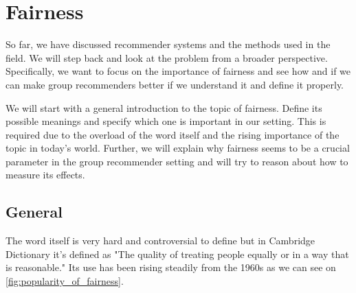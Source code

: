 \chapter{Fairness} \label{chap:fairness}

So far, we have discussed recommender systems and the methods used in the field. We will step back and look at the problem from a broader perspective. Specifically, we want to focus on the importance of fairness and see how and if we can make group recommenders better if we understand it and define it properly.

We will start with a general introduction to the topic of fairness. Define its possible meanings and specify which one is important in our setting. This is required due to the overload of the word itself and the rising importance of the topic in today's world. Further, we will explain why fairness seems to be a crucial parameter in the group recommender setting and will try to reason about how to measure its effects.




\section{General} \label{sec:02_general}





The word itself is very hard and controversial to define but in Cambridge Dictionary \cite{fairness_definition} it's defined as "The quality of treating people equally or in a way that is reasonable." Its use has been rising steadily from the 1960s as we can see on \ref{fig:popularity_of_fairness}.

